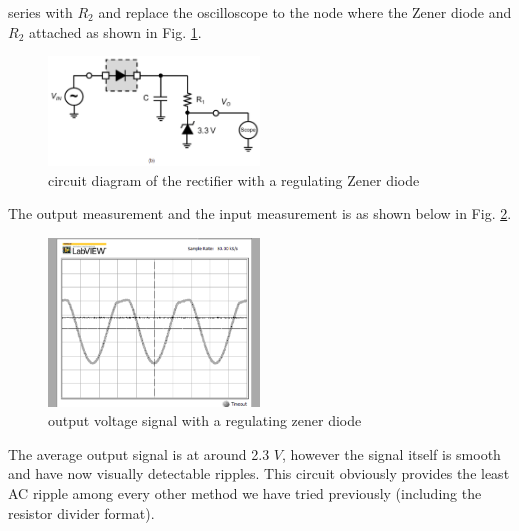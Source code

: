 \documentclass[letterpaper, 10 pt, conference]{ieeeconf}  %
\begin{document}
series with $R_{2}$ and replace the oscilloscope to the node where the Zener diode
and $R_{2}$ attached as shown in Fig. \ref{fig:5.3}.
\begin{figure}[h]
  \centering
  \includegraphics[width=0.5\textwidth]{images/5_3.png}
  \caption{circuit diagram of the rectifier with a regulating Zener diode}
  \label{fig:5.3}
\end{figure}
\par The output measurement and the input measurement is as shown below in Fig. \ref{fig:5.4}.
\begin{figure}[ht]
  \centering
  \includegraphics[width=0.5\textwidth]{images/5_4.png}
  \caption{output voltage signal with a regulating zener diode}
  \label{fig:5.4}
\end{figure}
\par The average output signal is at around 2.3 $V$, however the signal itself
is smooth and have now visually detectable ripples. This circuit obviously
provides the least AC ripple among every other method we have tried previously
(including the resistor divider format).
\clearpage
\end{document}

